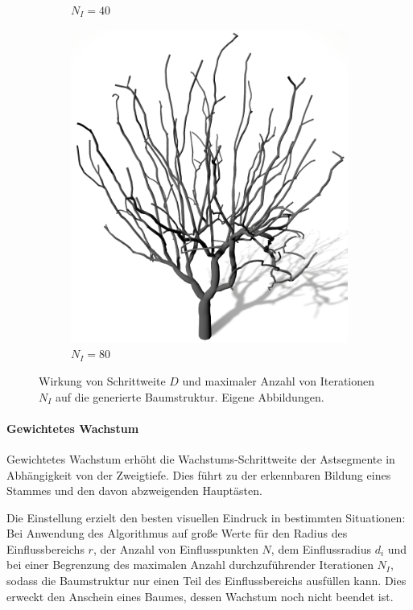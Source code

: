 \begin{figure} [hbtp]
\begin{subfigure}[t]{.19\textwidth}
		\caption{$N_I = 40$}
		\label{subfig:SCA_SI_Iterationen40}
	\end{subfigure}
	\begin{subfigure}[t]{.4\textwidth}
		\centering
		\includegraphics[height=.21\textheight]{images/SCA_SI_Iterationen80.png}
		\caption{$N_I = 80$}
		\label{subfig:SCA_SI_Iterationen80}
	\end{subfigure}
	\caption{Wirkung von Schrittweite $D$ und maximaler Anzahl von Iterationen $N_I$ auf die generierte Baumstruktur. Eigene Abbildungen.}
	\label{fig:SCA_SI}
\end{figure}


\paragraph{Gewichtetes Wachstum}

Gewichtetes Wachstum erhöht die Wachstums-Schrittweite der Astsegmente in Abhängigkeit von der Zweigtiefe. Dies führt zu der erkennbaren Bildung eines Stammes und den davon abzweigenden Hauptästen. 

Die Einstellung erzielt den besten visuellen Eindruck in bestimmten Situationen: Bei Anwendung des Algorithmus auf große Werte für den Radius des Einflussbereichs $r$, der Anzahl von Einflusspunkten $N$, dem Einflussradius $d_i$ und bei einer Begrenzung des maximalen Anzahl durchzuführender Iterationen $N_I$, sodass die Baumstruktur nur einen Teil des Einflussbereichs ausfüllen kann. Dies erweckt den Anschein eines Baumes, dessen Wachstum noch nicht beendet ist.

